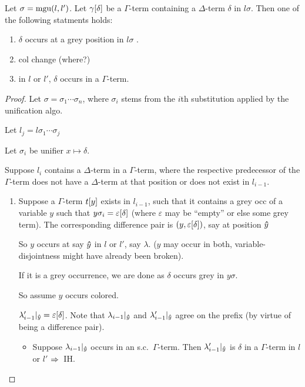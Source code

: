 \documentclass[,%
	paper=a4,%
	DIV11, %
	twoside=false,%
	liststotoc,
	bibtotoc,
	draft=false,%
	numbers=noendperiod
]{scrartcl}
\begin{document}
\clearpage
\begin{clemma}
	Let $\sigma = \operatorname{mgu}(l, l')$.
	Let $\gamma[\delta]$ be a $\Gamma$-term containing a $\Delta$-term $\delta$ in $l\sigma$.
	Then one of the following statments holds:
	\begin{enumerate}
		\item $\delta$ occurs at a grey position in $l\sigma$ .
		\item col change (where?)
		\item in $l$ or $l'$, $\delta$ occurs in a $\Gamma$-term.
	\end{enumerate}
\end{clemma}
\begin{proof}
	Let $\sigma = \sigma_1 \cdots \sigma_n$, where $\sigma_i$ stems from the $i$th substitution applied by the unification algo.

	Let $l_j = l\sigma_1 \cdots \sigma_j$

	Let $\sigma_i$ be unifier $x \mapsto \delta$.

	Suppose $l_i $ contains a $\Delta$-term in a $\Gamma$-term, where the respective predecessor of the $\Gamma$-term does not have a $\Delta$-term at that position or does not exist in $l_{i-1}$.

	\begin{enumerate}
		\item
			Suppose a $\Gamma$-term $t[y]$ exists in $l_{i-1}$, such that it contains a grey occ of a variable $y$ such that $y\sigma_i = \varepsilon[\delta]$  (where $\varepsilon$ may be ``empty'' or else some grey term).
			The corresponding difference pair is $(y, \varepsilon[\delta])$, say at position $\bm\hat y$

			So $y$ occurs at say $\bm\hat y$ in $l$ or $l'$, say $\lambda$. ($y$ may occur in both, variable-disjointness might have already been broken).

			If it is a grey occurrence, we are done as $\delta$ occurs grey in $y\sigma$. 

			So assume $y$ occurs colored.

			$\lambda'_{i-1}|_{\bm\hat y} = \varepsilon[\delta]$.
			Note that $\lambda_{i-1}|_{\bm\hat y}$ and $\lambda'_{i-1}|_{\bm\hat y}$ agree on the prefix (by virtue of being a difference pair).

			\begin{itemize}
				\item
					Suppose $\lambda_{i-1}|_{\bm\hat y}$ occurs in an s.c.\ $\Gamma$-term.
					Then $\lambda'_{i-1}|_{\bm\hat y}$ is $\delta$ in a $\Gamma$-term in $l$ or $l'$ $\Rightarrow$~IH.


\end{itemize}
\end{enumerate}
\end{proof}
\end{document}
